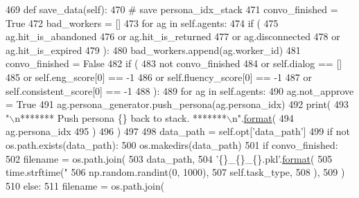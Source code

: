 \begin{DoxyCode}
469     \textcolor{keyword}{def }save\_data(self):
470         \textcolor{comment}{# save persona\_idx\_stack}
471         convo\_finished = \textcolor{keyword}{True}
472         bad\_workers = []
473         \textcolor{keywordflow}{for} ag \textcolor{keywordflow}{in} self.agents:
474             \textcolor{keywordflow}{if} (
475                 ag.hit\_is\_abandoned
476                 \textcolor{keywordflow}{or} ag.hit\_is\_returned
477                 \textcolor{keywordflow}{or} ag.disconnected
478                 \textcolor{keywordflow}{or} ag.hit\_is\_expired
479             ):
480                 bad\_workers.append(ag.worker\_id)
481                 convo\_finished = \textcolor{keyword}{False}
482         \textcolor{keywordflow}{if} (
483             \textcolor{keywordflow}{not} convo\_finished
484             \textcolor{keywordflow}{or} self.dialog == []
485             \textcolor{keywordflow}{or} self.eng\_score[0] == -1
486             \textcolor{keywordflow}{or} self.fluency\_score[0] == -1
487             \textcolor{keywordflow}{or} self.consistent\_score[0] == -1
488         ):
489             \textcolor{keywordflow}{for} ag \textcolor{keywordflow}{in} self.agents:
490                 ag.not\_approve = \textcolor{keyword}{True}
491                 ag.persona\_generator.push\_persona(ag.persona\_idx)
492                 print(
493                     \textcolor{stringliteral}{"\(\backslash\)n******* Push persona \{\} back to stack. *******\(\backslash\)n"}.\hyperlink{namespaceparlai_1_1chat__service_1_1services_1_1messenger_1_1shared__utils_a32e2e2022b824fbaf80c747160b52a76}{format}(
494                         ag.persona\_idx
495                     )
496                 )
497 
498         data\_path = self.opt[\textcolor{stringliteral}{'data\_path'}]
499         \textcolor{keywordflow}{if} \textcolor{keywordflow}{not} os.path.exists(data\_path):
500             os.makedirs(data\_path)
501         \textcolor{keywordflow}{if} convo\_finished:
502             filename = os.path.join(
503                 data\_path,
504                 \textcolor{stringliteral}{'\{\}\_\{\}\_\{\}.pkl'}.\hyperlink{namespaceparlai_1_1chat__service_1_1services_1_1messenger_1_1shared__utils_a32e2e2022b824fbaf80c747160b52a76}{format}(
505                     time.strftime(\textcolor{stringliteral}{"%
506                     np.random.randint(0, 1000),
507                     self.task\_type,
508                 ),
509             )
510         \textcolor{keywordflow}{else}:
511             filename = os.path.join(
}
\end{DoxyCode}
